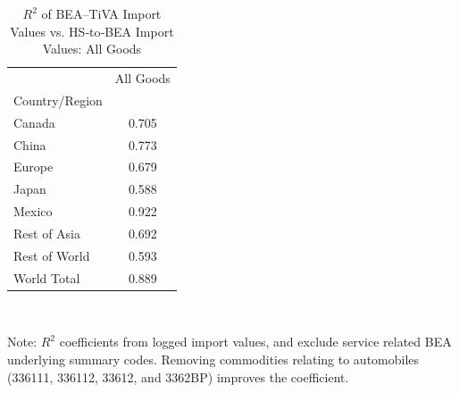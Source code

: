 \begin{table}[htbp]
\centering
\caption{$R^2$ of BEA--TiVA Import Values vs. HS‐to‐BEA Import Values: All Goods}
\label{correlation_coefficent_regions}
\begin{tabular}{lc}
\toprule
 & All Goods \\
Country/Region &  \\
\midrule
Canada & 0.705 \\
China & 0.773 \\
Europe & 0.679 \\
Japan & 0.588 \\
Mexico & 0.922 \\
Rest of Asia & 0.692 \\
Rest of World & 0.593 \\
World Total & 0.889 \\
\bottomrule
\end{tabular}
\vspace{0.01cm}\\
\raggedright
{\scriptsize Note: $R^2$ coefficients from logged import values, and exclude service related BEA underlying summary codes. Removing commodities relating to automobiles (336111, 336112, 33612, and 3362BP) improves the coefficient.}

\end{table}
